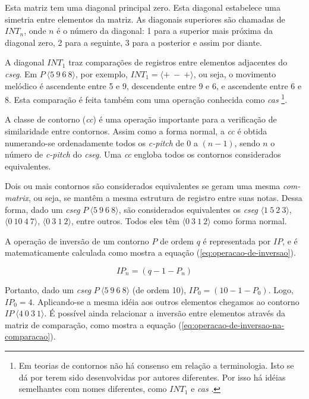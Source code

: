 \documentclass[brazil]{article}
\newcommand{\termo}[1]{\textit{#1}}
\begin{document}
Esta matriz tem uma diagonal principal zero. Esta diagonal estabelece
uma simetria entre elementos da matriz. As diagonais superiores são
chamadas de $INT_n$, onde $n$ é o número da diagonal: 1 para a
superior mais próxima da diagonal zero, 2 para a seguinte, 3 para a
posterior e assim por diante.

A diagonal $INT_1$ traz comparações de registros entre elementos
adjacentes do \termo{cseg}. Em $P\:\langle5\:9\:6\:8\rangle$, por
exemplo, $INT_1=\langle+\:-\:+\rangle$, ou seja, o movimento melódico
é ascendente entre 5 e 9, descendente entre 9 e 6, e ascendente entre
6 e 8. Esta comparação é feita também com uma operação conhecida como
\termo{cas} \footnote{Em teorias de contornos não há consenso em
  relação a terminologia. Isto se dá por terem sido desenvolvidas por
  autores diferentes. Por isso há idéias semelhantes com nomes
  diferentes, como $INT_1$ e \termo{cas}
  \cite{friedmann87:response}.}.

A classe de contorno (\termo{cc}) é uma operação importante para a
verificação de similaridade entre contornos. Assim como a forma
normal, a \termo{cc} é obtida numerando-se ordenadamente todos os
\termo{c-pitch} de $0$ a $(n-1)$, sendo $n$ o número de
\termo{c-pitch} do \termo{cseg}. Uma \termo{cc} engloba todos os
contornos considerados equivalentes.

Dois ou mais contornos são considerados equivalentes se geram uma
mesma \termo{com-matrix}, ou seja, se mantêm a mesma estrutura de
registro entre suas notas. Dessa forma, dado um \termo{cseg}
$P\:\langle5\:9\:6\:8\rangle$, são considerados equivalentes os
\termo{cseg} $\langle1\:5\:2\:3\rangle$, $\langle0\:10\:4\:7\rangle$,
$\langle0\:3\:1\:2\rangle$, entre outros. Todos eles têm
$\langle0\:3\:1\:2\rangle$ como forma normal.

A operação de inversão de um contorno $P$ de ordem $q$ é representada
por $IP$, e é matematicamente calculada como mostra a equação
(\ref{eq:operacao-de-inversao}).

\begin{equation}
  \label{eq:operacao-de-inversao}
  IP_n=(q-1-P_n)
\end{equation}

Portanto, dado um \termo{cseg} $P\:\langle5\:9\:6\:8\rangle$ (de ordem
10), $IP_0=(10-1-P_0)$. Logo, $IP_0=4$. Aplicando-se a mesma idéia aos
outros elementos chegamos ao contorno
$IP\:\langle4\:0\:3\:1\rangle$. É possível ainda relacionar a inversão
entre elementos através da matriz de comparação, como mostra a equação
(\ref{eq:operacao-de-inversao-na-comparacao}).
\end{document}
